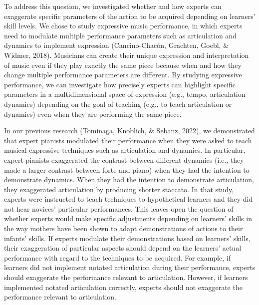 \documentclass[
  man,floatsintext]{apa6}
\begin{document}
To address this question, we investigated whether and how experts can exaggerate specific parameters of the action to be acquired depending on learners' skill levels. We chose to study expressive music performance, in which experts need to modulate multiple performance parameters such as articulation and dynamics to implement expression (Cancino-Chacón, Grachten, Goebl, \& Widmer, 2018). Musicians can create their unique expression and interpretation of music even if they play exactly the same piece because when and how they change multiple performance parameters are different. By studying expressive performance, we can investigate how precisely experts can highlight specific parameters in a multidimensional space of expression (e.g., tempo, articulation dynamics) depending on the goal of teaching (e.g., to teach articulation or dynamics) even when they are performing the same piece.

In our previous research (Tominaga, Knoblich, \& Sebanz, 2022), we demonstrated that expert pianists modulated their performance when they were asked to teach musical expressive techniques such as articulation and dynamics. In particular, expert pianists exaggerated the contrast between different dynamics (i.e., they made a larger contrast between forte and piano) when they had the intention to demonstrate dynamics. When they had the intention to demonstrate articulation, they exaggerated articulation by producing shorter staccato. In that study, experts were instructed to teach techniques to hypothetical learners and they did not hear novices' particular performances. This leaves open the question of whether experts would make specific adjustments depending on learners' skills in the way mothers have been shown to adapt demonstrations of actions to their infants' skills. If experts modulate their demonstrations based on learners' skills, their exaggeration of particular aspects should depend on the learners' actual performance with regard to the techniques to be acquired. For example, if learners did not implement notated articulation during their performance, experts should exaggerate the performance relevant to articulation. However, if learners implemented notated articulation correctly, experts should not exaggerate the performance relevant to articulation.
\end{document}
